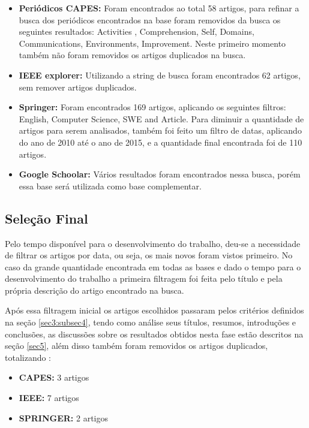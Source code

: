 \documentclass[12pt]{article}
\begin{document}
 \begin{itemize}
   \item  \textbf{Periódicos CAPES:} Foram encontrados ao total 58 artigos, para refinar a busca dos periódicos encontrados na base foram removidos da busca os seguintes resultados: Activities , Comprehension, Self, Domains, Communications, Environments, Improvement. Neste primeiro momento também não foram removidos os artigos duplicados na busca.
   \item  \textbf{IEEE explorer:} Utilizando a string de busca foram encontrados 62 artigos, sem remover artigos duplicados.
   \item  \textbf{Springer:} Foram encontrados 169 artigos, aplicando os seguintes filtros: English, Computer Science, SWE and Article. Para diminuir a quantidade de artigos para serem analisados, também foi feito um filtro de datas, aplicando do ano de 2010 até o ano de 2015, e a quantidade final encontrada foi de 110 artigos.
   \item  \textbf{Google Schoolar:} Vários resultados foram encontrados nessa busca, porém essa base será utilizada como base complementar.
 \end{itemize}

\subsection{Seleção Final} \label{sec4:subsec3}

Pelo tempo disponível para o desenvolvimento do trabalho, deu-se a necessidade de filtrar os artigos por data, ou seja, os mais novos foram vistos primeiro. No caso da grande quantidade encontrada em todas as bases e dado o tempo para o desenvolvimento do trabalho a primeira filtragem foi feita pelo título e pela própria descrição do artigo encontrado na busca.

Após essa filtragem inicial os artigos escolhidos passaram pelos critérios definidos na seção \ref{sec3:subsec4}, tendo como análise seus títulos, resumos, introduções e conclusões, as discussões sobre os resultados obtidos nesta fase estão descritos na seção \ref{sec5}, além disso também foram removidos os artigos duplicados, totalizando :

\begin{itemize}
	\item \textbf{CAPES:} 3 artigos
  	\item \textbf{IEEE:} 7 artigos
   	\item \textbf{SPRINGER:} 2 artigos
\end{itemize}
\end{document}
